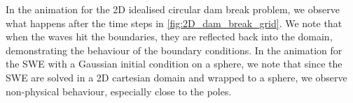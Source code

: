 In the animation for the 2D idealised circular dam break problem, we observe what happens after the time steps in \autoref{fig:2D_dam_break_grid}.
We note that when the waves hit the boundaries, they are reflected back into the domain, demonstrating the behaviour of the boundary conditions.
In the animation for the SWE with a Gaussian initial condition on a sphere, we note that since the SWE are solved in a 2D cartesian domain and wrapped to a sphere, we observe non-physical behaviour, especially close to the poles.
